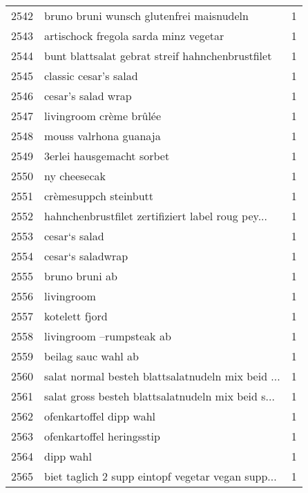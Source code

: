 \begin{tabular}{llr}
2542 &           bruno bruni wunsch glutenfrei maisnudeln &      1 \\
2543 &              artischock fregola sarda minz vegetar &      1 \\
2544 &   bunt blattsalat gebrat streif hahnchenbrustfilet &      1 \\
2545 &                              classic cesar’s salad &      1 \\
2546 &                                 cesar’s salad wrap &      1 \\
2547 &                            livingroom crème brûlée &      1 \\
2548 &                             mouss valrhona guanaja &      1 \\
2549 &                          3erlei hausgemacht sorbet &      1 \\
2550 &                                       ny cheesecak &      1 \\
2551 &                              crèmesuppch steinbutt &      1 \\
2552 &  hahnchenbrustfilet zertifiziert label roug pey... &      1 \\
2553 &                                      cesar‘s salad &      1 \\
2554 &                                  cesar‘s saladwrap &      1 \\
2555 &                                     bruno bruni ab &      1 \\
2556 &                                         livingroom &      1 \\
2557 &                                     kotelett fjord &      1 \\
2558 &                           livingroom –rumpsteak ab &      1 \\
2559 &                                beilag sauc wahl ab &      1 \\
2560 &  salat normal besteh blattsalatnudeln mix beid ... &      1 \\
2561 &  salat gross besteh blattsalatnudeln mix beid s... &      1 \\
2562 &                            ofenkartoffel dipp wahl &      1 \\
2563 &                          ofenkartoffel heringsstip &      1 \\
2564 &                                          dipp wahl &      1 \\
2565 &  biet taglich 2 supp eintopf vegetar vegan supp... &      1 \\

\end{tabular}
